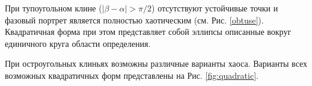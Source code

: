 \documentclass[a4paper]{article}
\begin{document}
 При тупоугольном клине ($|\beta-\alpha|>\pi/2$) отсутствуют устойчивые точки и фазовый портрет является полностью хаотическим (см. Рис. \ref{obtuse}). Квадратичная форма при этом представляет собой эллипсы описанные вокруг единичного круга области определения. 
 
 При остроугольных клиньях возможны различные варианты хаоса. 
Варианты всех возможных квадратичных форм представлены на Рис. \ref{fig:quadratic}.\


\end{document}
